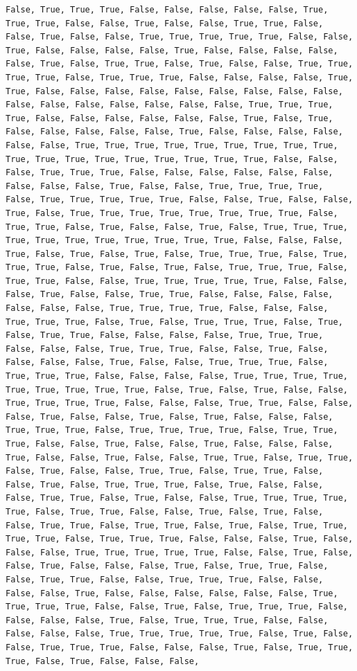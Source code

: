 \documentclass[
  letterpaper,
  DIV=11,
  numbers=noendperiod]{scrartcl}
\begin{document}
\begin{verbatim}
False, True, True, True, False, False, False, False, False, True, True, True, False, False, True, False, False, True, True, False, False, True, False, False, True, True, True, True, True, False, False, True, False, False, False, False, True, False, False, False, False, False, True, False, True, True, False, True, False, False, True, True, True, True, False, True, True, True, False, False, False, False, True, True, False, False, False, False, False, False, False, False, False, False, False, False, False, False, False, False, True, True, True, True, False, False, False, False, False, False, True, False, True, False, False, False, False, False, True, False, False, False, False, False, False, True, True, True, True, True, True, True, True, True, True, True, True, True, True, True, True, True, True, False, False, False, True, True, True, False, False, False, False, False, False, False, False, False, True, False, False, True, True, True, True, False, True, True, True, True, True, False, False, True, False, False, True, False, True, True, True, True, True, True, True, True, False, True, True, False, True, False, False, True, False, True, True, True, True, True, True, True, True, True, True, True, False, False, False, True, False, True, False, True, False, True, True, True, False, True, True, True, False, True, False, True, False, True, True, True, False, True, True, False, False, True, True, True, True, True, False, False, False, True, False, False, True, True, False, False, False, False, False, False, False, True, True, True, True, False, False, False, True, True, True, False, True, False, True, True, True, False, True, False, True, True, False, False, False, False, True, True, True, False, False, False, True, True, True, False, False, True, False, False, False, False, True, False, False, True, True, True, False, True, True, True, False, False, False, False, True, True, True, True, True, True, True, True, True, False, True, False, True, False, False, True, True, True, True, False, False, False, True, True, False, False, False, True, False, False, True, False, True, False, False, False, True, True, True, False, True, True, True, True, False, True, True, True, False, False, True, False, False, True, False, False, False, True, False, False, True, False, False, True, True, False, True, True, False, True, False, False, True, True, False, True, True, False, False, True, False, True, True, True, False, True, False, False, False, True, True, False, True, False, False, True, True, True, True, True, False, True, True, False, False, True, False, True, False, False, True, True, False, True, True, False, True, False, True, True, True, True, False, True, True, True, False, False, False, True, False, False, False, True, True, True, True, True, False, False, True, False, False, True, False, False, False, True, False, True, True, False, False, True, True, False, False, True, True, True, False, False, False, False, True, False, False, False, False, False, False, True, True, True, True, False, False, True, False, True, True, True, False, False, False, False, True, False, True, True, True, False, False, False, False, False, True, True, True, True, True, False, True, False, False, True, True, True, False, False, False, True, False, True, True, True, False, True, False, False, False, 
\end{verbatim}
\end{document}
